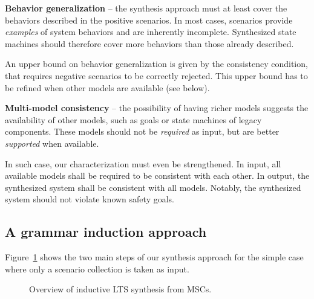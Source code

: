 \noindent \textbf{Behavior generalization} -- the synthesis approach must at least cover the behaviors described in the positive scenarios. In most cases, scenarios provide \emph{examples} of system behaviors and are inherently incomplete. Synthesized state machines should therefore cover more behaviors than those already described. 

An upper bound on behavior generalization is given by the consistency condition, that requires negative scenarios to be correctly rejected. This upper bound has to be refined when other models are available (see below).

\noindent \textbf{Multi-model consistency} -- the possibility of having richer models suggests the availability of other models, such as goals or state machines of legacy components. These models should not be \emph{required} as input, but are better \emph{supported} when available. 

In such case, our characterization must even be strengthened. In input, all available models shall be required to be consistent with each other. In output, the synthesized system shall be consistent with all models. Notably, the synthesized system should not violate known safety goals.


\subsection{A grammar induction approach\label{subsection:inductive-synthesis-approach}}

Figure~\ref{image:inductive-synthesis-overview} shows the two main steps of our synthesis approach for the simple case where only a scenario collection is taken as input. 

\begin{figure}[H]\centering
  \caption{Overview of inductive LTS synthesis from MSCs.\label{image:inductive-synthesis-overview}}
\end{figure}

